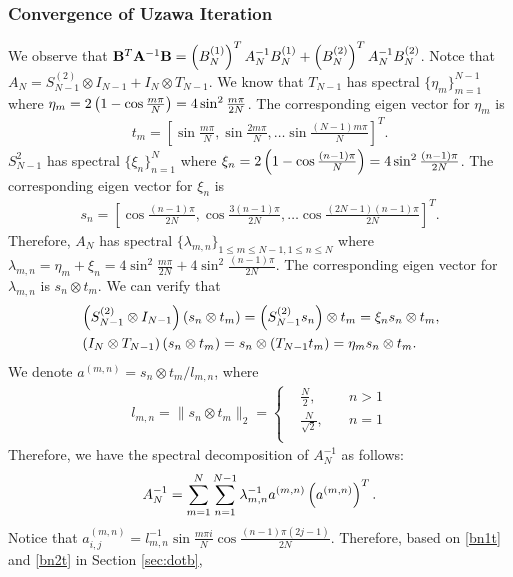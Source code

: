 \documentclass[english]{pkupaper}
\newenvironment{eqt}{\begin{equation}\begin{aligned}}{\end{aligned}\end{equation}}
\begin{document}
\subsubsection{Convergence of Uzawa Iteration}
We observe that $\mathbf{B}^T\mathbf{A}^{-1}\mathbf{B}=\left( B_N^{(1)}\right)^TA_N^{-1}B_N^{(1)}+\left( B_N^{(2)}\right)^TA_N^{-1}B_N^{(2)}$. Notce that $A_N=S_{N-1}^{(2)}\otimes I_{N-1}+I_N\otimes T_{N-1}$. We know that $T_{N-1}$ has spectral $\{\eta_m\}_{m=1}^{N-1}$ where $\eta_m=2\left(1-\cos\frac{m\pi}{N}\right)=4\sin^2\frac{m\pi}{2N}$. The corresponding eigen vector for $\eta_m$ is 
\begin{eqt}
t_m=\left[\sin\frac{m\pi}{N}, \sin\frac{2m\pi}{N}, \dots \sin\frac{(N-1)m\pi}{N}\right]^T.
\end{eqt}
$S_{N-1}^2$ has spectral $\{\xi_n\}_{n=1}^{N}$ where $\xi_n=2\left(1-\cos \frac{(n-1)\pi}{N}\right)=4\sin^2\frac{(n-1)\pi}{2N}$. The corresponding eigen vector for $\xi_n$ is 
\begin{eqt}
s_n = \left[ \cos\frac{(n-1)\pi}{2N}, \cos\frac{3(n-1)\pi}{2N}, \dots \cos\frac{(2N-1)(n-1)\pi}{2N}  \right]^T.
\end{eqt}
Therefore, $A_N$ has spectral $\{\lambda_{m,n}\}_{1\leq m\leq N-1, 1\leq n\leq N}$ where $\lambda_{m,n}=\eta_m+\xi_n=4\sin^2\frac{m\pi}{2N}+4\sin^2\frac{(n-1)\pi}{2N}$. The corresponding eigen vector for $\lambda_{m,n}$ is $s_n\otimes t_m$. We can verify that
\begin{eqt}
&\lp S_{N-1}^{(2)}\otimes I_{N-1}\rp(s_n\otimes t_m)=\lp S_{N-1}^{(2)}s_n \rp \otimes t_m=\xi_n s_n\otimes t_m,\\
&\lp I_N\otimes T_{N-1}\rp(s_n\otimes t_m)=s_n\otimes\lp  T_{N-1} t_m \rp=\eta_m s_n\otimes t_m.\\
\end{eqt}
We denote $a^{(m,n)}=s_n\otimes t_m/l_{m,n}$, where 
\begin{eqt}
l_{m,n}=\|s_n\otimes t_m\|_2=\left\{\begin{aligned}
&\frac{N}{2}, \quad &n>1\\
&\frac{N}{\sqrt{2}}, \quad &n=1\\
\end{aligned}\right.
\end{eqt}
Therefore, we have the spectral decomposition of $A_N^{-1}$ as follows:
\begin{eqt}
A_N^{-1}=\sum_{m=1}^{N}\sum_{n=1}^{N-1}\lambda_{m,n}^{-1}a^{(m,n)}\lp a^{(m,n)}\rp^T.
\end{eqt}
Notice that $a^{(m,n)}_{i,j}=l_{m,n}^{-1}\sin\frac{m\pi i}{N}\cos\frac{(n-1)\pi(2j-1)}{2N}$. Therefore, based on \ref{bn1t} and \ref{bn2t} in Section \ref{sec:dotb}, 
\end{document}
